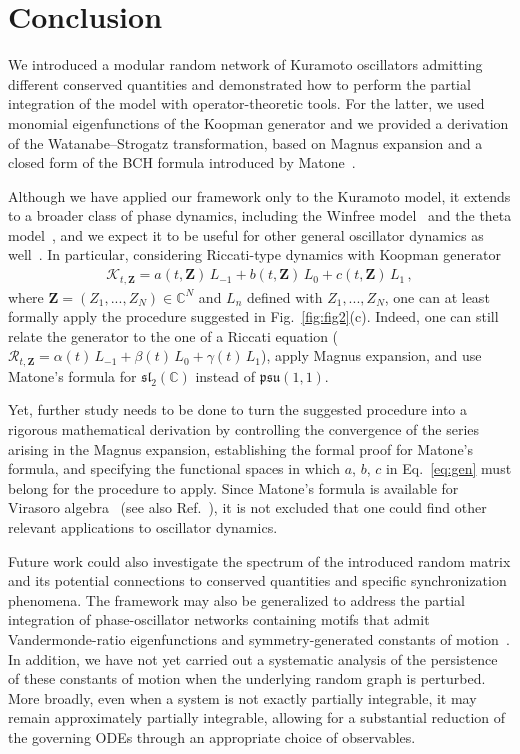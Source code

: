 \documentclass[aps,pre,reprint,longbibliography,superscriptaddress,noshowpacs,floatfix]{revtex4-2}
\theoremstyle{definition}
\theoremstyle{remark}
\begin{document}
\section*{Conclusion}

We introduced a modular random network of Kuramoto oscillators admitting different conserved quantities and demonstrated how to perform the partial integration of the model with operator-theoretic tools. For the latter, we used monomial eigenfunctions of the Koopman generator and we provided a derivation of the Watanabe–Strogatz transformation, based on Magnus expansion and a closed form of the BCH formula introduced by Matone~\cite{Matone2015}.

Although we have applied our framework only to the Kuramoto model, it extends to a broader class of phase dynamics, including the Winfree model~\cite{Winfree1967} and the theta model~\cite{Ermentrout1986}, and we expect it to be useful for other general oscillator dynamics as well~\cite{Lohe2009, Lohe2010, Lohe2018, Tanaka2014, Chandra2019a, Bronski2020, Lipton2021, Gong2019, Cestnik2024}. In particular, considering Riccati-type dynamics with Koopman generator
\begin{align}\label{eq:gen}
     \mathcal{K}_{t,\mathbf{Z}} =  a(t, \mathbf{Z}) \,L_{-1} + b(t, \mathbf{Z})\, L_0 + c(t, \mathbf{Z})\,L_1\,,
\end{align}
where $\mathbf{Z} = (Z_1,...,Z_N)\in\mathbb{C}^N$ and $L_n$ defined with $Z_1,...,Z_N$, one can at least formally apply the procedure suggested in Fig.~\ref{fig:fig2}(c). Indeed, one can still relate the generator to the one of a Riccati equation ($\mathcal{R}_{t,\mathbf{Z}} =  \alpha(t) \,L_{-1} + \beta(t)\, L_0 + \gamma(t)\,L_1$), apply Magnus expansion, and use Matone's formula for $\mathfrak{sl}_2(\mathbb{C})$ instead of $\mathfrak{psu}(1,1)$. 

Yet, further study needs to be done to turn the suggested procedure into a rigorous mathematical derivation by controlling the convergence of the series arising in the Magnus expansion, establishing the formal proof for Matone's formula, and specifying the functional spaces in which $a$, $b$, $c$ in Eq.~\eqref{eq:gen} must belong for the procedure to apply. Since Matone's formula is available for Virasoro algebra~\cite{Matone2015} (see also Ref.~\cite{Matone2016}), it is not excluded that one could find other relevant applications to oscillator dynamics. 

Future work could also investigate the spectrum of the introduced random matrix and its potential connections to conserved quantities and specific synchronization phenomena. The framework may also be generalized to address the partial integration of phase-oscillator networks containing motifs that admit Vandermonde-ratio eigenfunctions and symmetry-generated constants of motion~\cite{Thibeault2026}. In addition, we have not yet carried out a systematic analysis of the persistence of these constants of motion when the underlying random graph is perturbed. More broadly, even when a system is not exactly partially integrable, it may remain approximately partially integrable, allowing for a substantial reduction of the governing ODEs through an appropriate choice of observables.
\end{document}
